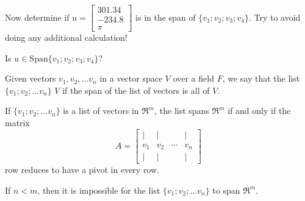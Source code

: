 \edXsolution{ 
}


\endedxproblem


Now determine if  $u = \left[\begin{array}{c} 301.34 \\ -234.8 \\ \pi \end{array} \right]$
is in the span of $\{v_1; v_2; v_3; v_4 \}$.  Try to avoid doing any additional calculation!

Is $u \in \mathrm{Span}\{v_1; v_2; v_3; v_4 \}$?   



\edXsolution{ 
}


\endedxproblem


\endedxvertical








Given vectors $v_1, v_2, \ldots v_n$ in a vector space $V$ over a field $F$, we say that the list $\{v_1; v_2; \ldots v_n\}$ {} $V$ if 
the span of the list of vectors is all of $V$.



\endedxtext


If $\{v_1; v_2; \ldots v_n\}$ is a list of vectors in $\Re^m$, the list spans $\Re^m$ if and only if 
the matrix 
\[ A = \left[ \begin{array}{cccc} | & | & & | \\ 
v_1 & v_2 & \cdots & v_n \\
 | & | & & | \end{array} \right] \]
 row reduces to have a pivot in every row.  
 
If $n<m$, then it is impossible for the list $\{v_1; v_2; \ldots v_n\}$ to span $\Re^m$.    

\endedxtext





